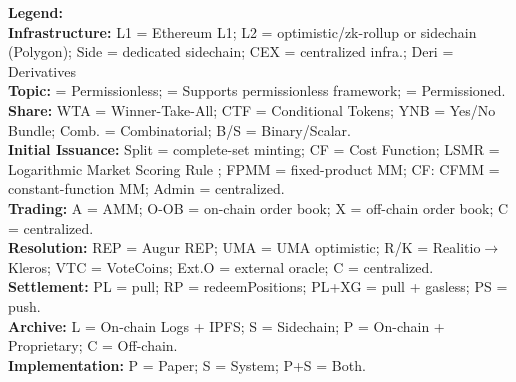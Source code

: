 \begin{table}[!htbp]
\vspace{0.30em}
\begin{minipage}{\textwidth}
\footnotesize
\textbf{Legend:} \\
\textbf{Infrastructure:} L1 = Ethereum L1; L2 = optimistic/zk-rollup or sidechain (Polygon); Side = dedicated sidechain; CEX = centralized infra.; Deri = Derivatives\\
\textbf{Topic:} \Circle = Permissionless; \LEFTcircle = Supports permissionless framework; \CIRCLE = Permissioned. \\
\textbf{Share:} WTA = Winner-Take-All; CTF = Conditional Tokens; YNB = Yes/No Bundle; Comb. = Combinatorial; B/S = Binary/Scalar. \\
\textbf{Initial Issuance:} Split = complete-set minting; CF = Cost Function; LSMR = Logarithmic Market Scoring Rule ; FPMM = fixed-product MM; CF: CFMM = constant-function MM; Admin = centralized. \\
\textbf{Trading:} A = AMM; O-OB = on-chain order book; X = off-chain order book; C = centralized. \\
\textbf{Resolution:} REP = Augur REP; UMA = UMA optimistic; R/K = Realitio$\rightarrow$Kleros; VTC = VoteCoins; Ext.O = external oracle; C = centralized. \\
\textbf{Settlement:} PL = pull; RP = redeemPositions; PL+XG = pull + gasless; PS = push. \\
\textbf{Archive:} L = On-chain Logs + IPFS; S = Sidechain; P = On-chain + Proprietary; C = Off-chain. \\
\textbf{Implementation:} P = Paper; S = System; P+S = Both.
\end{minipage}
\end{table}


